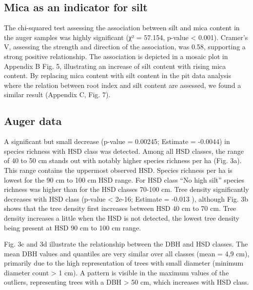 \documentclass[fleqn,11pt]{latex/stylish_article} %
\begin{document}
\normalsize

\hypertarget{mica-as-an-indicator-for-silt}{%
\subsection{Mica as an indicator for silt}\label{mica-as-an-indicator-for-silt}}

The chi-squared test assessing the association between silt and mica content in the auger samples was highly significant (χ² = 57.154, p-value \textless{} 0.001). Cramer's V, assessing the strength and direction of the association, was 0.58, supporting a strong positive relationship. The association is depicted in a mosaic plot in Appendix B Fig. 5, illustrating an increase of silt content with rising mica content. By replacing mica content with silt content in the pit data analysis where the relation between root index and silt content are assessed, we found a similar result (Appendix C, Fig. 7).

\hypertarget{auger-data}{%
\subsection{Auger data}\label{auger-data}}

A significant but small decrease (p-value = 0.00245; Estimate = -0.0044) in species richness with HSD class was detected. Among all HSD classes, the range of 40 to 50 cm stands out with notably higher species richness per ha (Fig. 3a). This range contains the uppermost observed HSD. Species richness per ha is lowest for the 90 cm to 100 cm HSD range. For HSD class \enquote{No high silt} species richness was higher than for the HSD classes 70-100 cm. Tree density significantly decreases with HSD class (p-value \textless{} 2e-16; Estimate = -0.013 ), although Fig. 3b shows that the tree density first increases between HSD 40 cm to 70 cm. Tree density increases a little when the HSD is not detected, the lowest tree density being present at HSD 90 cm to 100 cm range.

Fig. 3c and 3d illustrate the relationship between the DBH and HSD classes. The mean DBH values and quantiles are very similar over all classes (mean = 4,9 cm), primarily due to the high representation of trees with small diameter (minimum diameter count \textgreater{} 1 cm). A pattern is visible in the maximum values of the outliers, representing trees with a DBH \textgreater{} 50 cm, which increases with HSD class.
\end{document}
